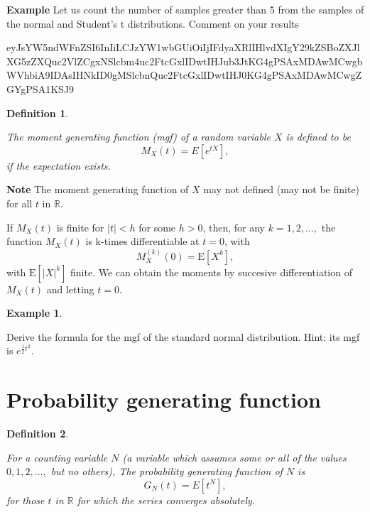 \documentclass[landscape, 20pt]{extreport}
\theoremstyle{definition}
\newtheorem{definition}{Definition}[chapter]
\theoremstyle{definition}
\newtheorem{example}{Example}[chapter]
\theoremstyle{definition}
\theoremstyle{definition}
\theoremstyle{remark}
\begin{document}
\textbf{Example} Let us count the number of samples greater than 5 from the samples of the normal and Student's t distributions. Comment on your results

eyJsYW5ndWFnZSI6InIiLCJzYW1wbGUiOiIjIFdyaXRlIHlvdXIgY29kZSBoZXJlXG5zZXQuc2VlZCgxNSlcbm4uc2FtcGxlIDwtIHJub3JtKG4gPSAxMDAwMCwgbWVhbiA9IDAsIHNkID0gMSlcbnQuc2FtcGxlIDwtIHJ0KG4gPSAxMDAwMCwgZGYgPSA1KSJ9

\begin{definition}
\protect\hypertarget{def:unlabeled-div-15}{}\label{def:unlabeled-div-15}

\emph{The moment generating function (mgf) of a random
variable \(X\) is defined to be \[M_X(t) = E[e^{tX}],\] if the expectation
exists.}

\end{definition}

\textbf{Note} The moment generating function of \(X\) may not defined (may not
be finite) for all \(t\) in \(\mathbb{R}\).

If \(M_X(t)\) is finite for \(|t| < h\) for some \(h > 0\), then, for any
\(k = 1, 2, \ldots,\) the function \(M_X(t)\) is k-times differentiable at
\(t = 0\), with \[M^{(k)}_X (0) = \mathrm{E}[X^k],\] with
\(\mathrm{E}[|X|^k]\) finite. We can obtain the moments by succesive
differentiation of \(M_X(t)\) and letting \(t = 0\).

\begin{example}
\protect\hypertarget{exm:unlabeled-div-16}{}\label{exm:unlabeled-div-16}

Derive the formula for the mgf of the standard normal distribution.
Hint: its mgf is \(e^{\frac{1}{2} t^2}\).

\end{example}

\hypertarget{probability-generating-function}{%
\section{Probability generating function}\label{probability-generating-function}}

\begin{definition}
\protect\hypertarget{def:unlabeled-div-17}{}\label{def:unlabeled-div-17}

\emph{For a counting variable \(N\) (a variable which
assumes some or all of the values \(0, 1, 2, \ldots,\) but no others), The
probability generating function of \(N\) is \[G_N(t) = E[t^N],\] for those
\(t\) in \(\mathbb{R}\) for which the series converges absolutely. }

\end{definition}
\end{document}
